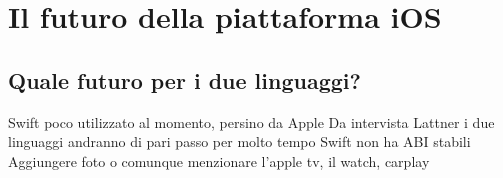 \chapter{Il futuro della piattaforma iOS}
\section{Quale futuro per i due linguaggi?}
Swift poco utilizzato al momento, persino da Apple
Da intervista Lattner i due linguaggi andranno di pari passo per molto tempo
Swift non ha ABI stabili 
Aggiungere foto o comunque menzionare l'apple tv, il watch, carplay